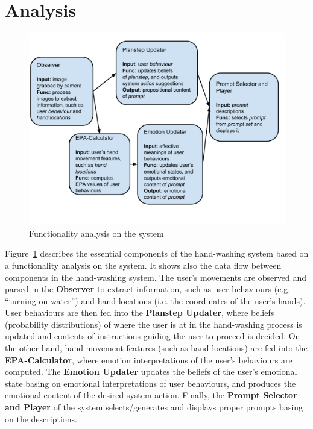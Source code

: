 \section{Analysis}

\begin{figure}[p]
\centering
\includegraphics[width=\linewidth]{fig-components.pdf}
\caption{Functionality analysis on the system}
\label{fig:components}
\end{figure}

Figure~\ref{fig:components} describes the essential components of the hand-washing system based on a functionality analysis on the system. It shows also the data flow between components in the hand-washing system. The user's movements are observed and parsed in the \textbf{Observer} to extract information, such as user behaviours (e.g. ``turning on water'') and hand locations (i.e. the coordinates of the user's hands). User behaviours are then fed into the \textbf{Planstep Updater}, where beliefs (probability distributions) of where the user is at in the hand-washing process is updated and contents of instructions guiding the user to proceed is decided. On the other hand, hand movement features (such as hand locations) are fed into the \textbf{EPA-Calculator}, where emotion interpretations of the user's behaviours are computed. The \textbf{Emotion Updater} updates the beliefs of the user's emotional state basing on emotional interpretations of user behaviours, and produces the emotional content of the desired system action. Finally, the \textbf{Prompt Selector and Player} of the system selects/generates and displays proper prompts basing on the descriptions. 

